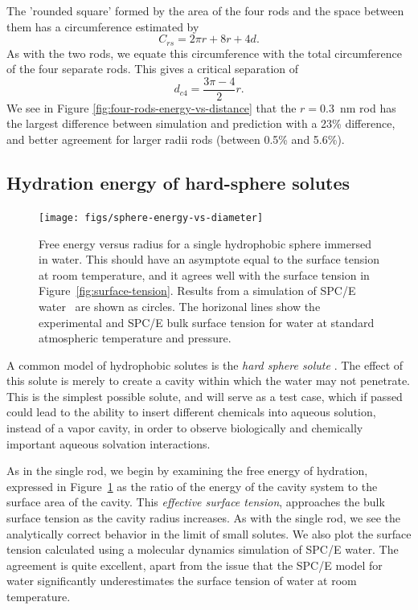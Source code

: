 \documentclass[letterpaper,twocolumn,amsmath,amssymb,prb]{revtex4-1}
\begin{document}
The 'rounded square' formed by the area of the four rods and the space
between them has a circumference estimated by
\begin{equation}
C_{rs} = 2 \pi r + 8r + 4d.
\end{equation}
As with the two rods, we equate this circumference with the total circumference of
the four separate rods. This gives a critical separation of
\begin{equation}
d_{c4} = \frac{3 \pi - 4}{2} r. \label{criticalfourrods}
\end{equation}
We see in Figure \ref{fig:four-rods-energy-vs-distance} that the $r = 0.3$~nm
rod has the largest difference between simulation and prediction with
a 23\% difference, and better agreement for larger radii rods (between 0.5\% and 5.6\%).

\subsection{Hydration energy of hard-sphere solutes}

\begin{figure}
\begin{center}
\texttt{[image: figs/sphere-energy-vs-diameter]}
\end{center}
\caption{ Free energy versus radius for a single hydrophobic sphere
  immersed in water. This should have an asymptote equal to the
  surface tension at room temperature, and it agrees well with the
  surface tension in Figure~\ref{fig:surface-tension}. Results from a
  simulation of SPC/E water~\cite{huang2001shs} are shown as circles.
  The horizonal lines show the experimental and SPC/E bulk surface
  tension for water at standard atmospheric temperature and
  pressure. }
\label{fig:sphere-energy-vs-diameter}
\end{figure}

A common model of hydrophobic solutes is the \emph{hard sphere solute}
\cite{sedlmeier2011entropy}.  The effect of this solute is merely to create
a cavity within which the water may not penetrate.  This is the
simplest possible solute, and will serve as a test case, which if
passed could lead to the ability to insert different chemicals into
aqueous solution, instead of a vapor cavity, in order to observe
biologically and chemically important aqueous solvation interactions.

As in the single rod, we begin by examining the free energy of
hydration, expressed in Figure~\ref{fig:sphere-energy-vs-diameter} as
the ratio of the energy of the cavity system to the surface area of
the cavity.  This \emph{effective surface tension}, approaches the
bulk surface tension as the cavity radius increases.  As with the
single rod, we see the analytically correct behavior in the limit of
small solutes.  We also plot the surface tension calculated using a
molecular dynamics simulation of SPC/E water\cite{huang2001shs}.  The
agreement is quite excellent, apart from the issue that the SPC/E
model for water significantly underestimates the surface tension of
water at room temperature\cite{vega2007surface}.
\end{document}
